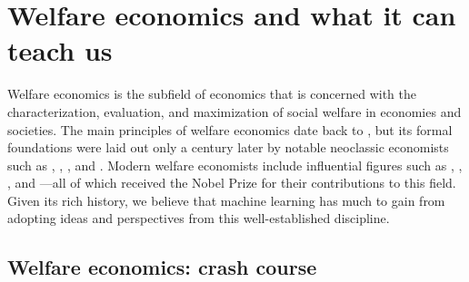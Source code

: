 
\section{Welfare economics and what it can teach us} \label{sec:welfecon}

Welfare economics is the subfield of economics that is concerned with the 
characterization, evaluation, and maximization of social welfare in economies and societies.
The main principles of welfare economics date back to \citet{smith1759moral,smith1776wealth},
but its formal foundations were laid out only a century later by
notable neoclassic economists such as
\citet{edgeworth1881psychics},
\citet{marshall1890principles},
\citet{pareto1906manual},
and \citet{pigou1920welfare}.
Modern welfare economists include influential figures such as
\citet{hicks1939value},
\citet{arrow1951social},
\citet{sen1970collective},
and \citet{stiglitz2012inequality}---all of which received the Nobel Prize for their contributions to this field.
Given its rich history,
we believe that machine learning has much to gain from adopting ideas and perspectives
from this well-established discipline.

\subsection{Welfare economics: crash course}
